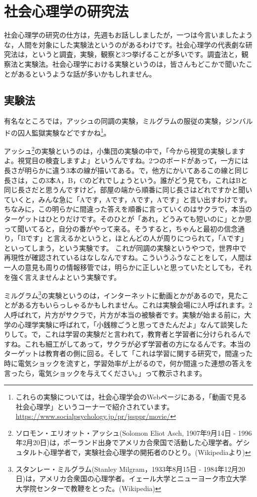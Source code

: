 \documentclass{ltjsbook}
\begin{document}
\section{社会心理学の研究法}
社会心理学の研究の仕方は，先週もお話ししましたが，一つは今言いましたような，人間を対象にした実験法というのがあるわけです。社会心理学の代表劇な研究法は，というと調査，実験，観察と3つ挙げることが多いです。調査法と，観察法と実験法。社会心理学における実験というのは，皆さんもどこかで聞いたことがあるというような話が多いかもしれません。
\subsection{実験法}
有名なところでは，アッシュの同調の実験，ミルグラムの服従の実験，ジンバルドの囚人監獄実験などですかね\footnote{これらの実験については，社会心理学会のWebページにある，「動画で見る社会心理学」というコーナーで紹介されています。\url{https://www.socialpsychology.jp/pr/jssppr/movie/}}。

アッシュ\footnote{ソロモン・エリオット・アッシュ(Solomon Eliot Asch, 1907年9月14日 - 1996年2月20日)は，ポーランド出身でアメリカ合衆国で活動した心理学者。ゲシュタルト心理学者で，実験社会心理学の開拓者のひとり。(Wikipediaより)}の実験というのは，小集団の実験の中で，「今から視覚の実験しますよ。視覚目の検査しますよ」というんですね。2つのボードがあって，一方には長さが明らかに違う3本の線が描いてある。で，他方にかいてあるこの線と同じ長さは，この3本A，B，Cのどれでしょうという。誰がどう見ても，これはBと同じ長さだと思うんですけど，部屋の端から順番に同じ長さはどれですかと聞いていくと，みんな急に「Aです，Aです，Aです，Aです」と言い出すわけです。ちなみに，この明らかに間違った答えを順番に言っていくのはサクラで，本当のターゲットはひとりだけです。そのひとが「あれ，どうみても短いのに」とか思って聞いてると，自分の番がやって来る。そうすると，ちゃんと最初の信念通り，「Bです」と言えるかというと，ほとんどの人が周りにつられて，「Aです」といってしまう，という実験です。
これが同調の実験というやつで，世界中で再現性が確認されているはなしなんですね。こういうふうなことをして，人間は一人の意見も周りの情報移管では，明らかに正しいと思っていたとしても，それを強く言えませんよという実験です。

ミルグラム\footnote{スタンレー・ミルグラム(Stanley Milgram，1933年8月15日 - 1984年12月20日)は，アメリカ合衆国の心理学者。イェール大学とニューヨーク市立大学大学院センターで教鞭をとった。(Wikipedia)}の実験というのは，インターネットに動画とかがあるので，見たことがある方もいらっしゃるかもしれません。これは実験会場に2人呼ばれます。2人呼ばれて，片方がサクラで，片方が本当の被験者です。実験が始まる前に，大学の心理学実験に呼ばれて，「小銭稼ごうと思ってきたんだよ」なんて談笑したりして。で，これは学習の実験だと言われて，教育者と学習者に分けられるんですね。これも細工がしてあって，サクラが必ず学習者の方になるんです。本当のターゲットは教育者の側に回る。そして「これは学習に関する研究で，間違った時に電気ショックを流すと，学習効率が上がるので，何か間違った連想の答えを言ったら，電気ショックを与えてください。」って教示されます。
\end{document}
